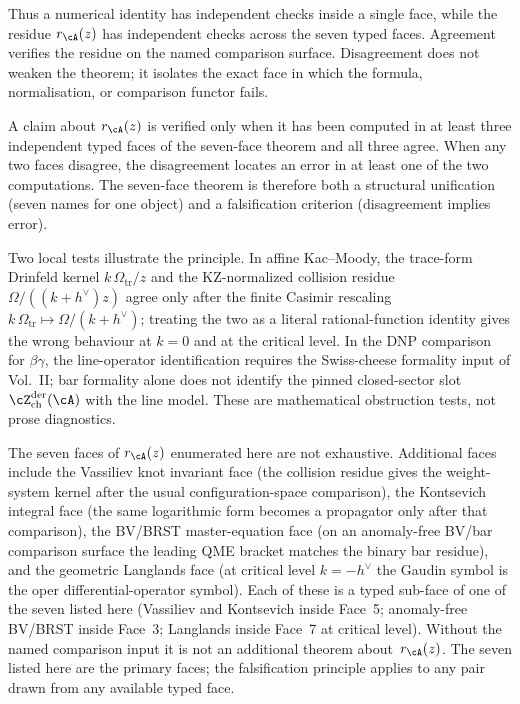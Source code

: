 Thus a numerical identity has independent checks inside a single
face, while the residue $r_\cA(z)$ has independent checks across the
seven typed faces. Agreement verifies the residue on the named
comparison surface. Disagreement does not weaken the theorem; it
isolates the exact face in which the formula, normalisation, or
comparison functor fails.

\begin{principle}
\label{princ:hdm-falsification}
A claim about $r_\cA(z)$ is verified only when it has been computed
in at least three independent typed faces of the seven-face theorem and
all three agree. When any two faces disagree, the disagreement
locates an error in at least one of the two computations. The
seven-face theorem is therefore both a structural unification
\textup{(}seven names for one object\textup{)} and a falsification
criterion \textup{(}disagreement implies error\textup{)}.
\end{principle}

Two local tests illustrate the principle. In affine Kac--Moody, the
trace-form Drinfeld kernel $k\,\Omega_{\mathrm{tr}}/z$ and the
KZ-normalized collision residue $\Omega/((k+h^\vee)z)$ agree only
after the finite Casimir rescaling
$k\,\Omega_{\mathrm{tr}}\mapsto\Omega/(k+h^\vee)$; treating the two as
a literal rational-function identity gives the wrong behaviour at
$k=0$ and at the critical level. In the DNP comparison for
$\beta\gamma$, the line-operator identification requires the
Swiss-cheese formality input of Vol.~II; bar formality alone does not
identify the pinned closed-sector slot
$\cZ^{\mathrm{der}}_{\mathrm{ch}}(\cA)$ with the line model. These are
mathematical obstruction tests, not prose diagnostics.

\begin{remark}
\label{rem:hdm-why-seven}
The seven faces of $r_\cA(z)$ enumerated here are not exhaustive.
Additional faces include the Vassiliev knot invariant face (the
collision residue gives the weight-system kernel after the usual
configuration-space comparison), the Kontsevich integral face (the
same logarithmic form becomes a propagator only after that comparison),
the BV/BRST master-equation face (on an anomaly-free BV/bar comparison
surface the leading QME bracket matches the binary bar residue), and
the geometric Langlands face (at critical level $k=-h^\vee$ the
Gaudin symbol is the oper differential-operator symbol). Each of
these is a typed sub-face of one of the seven listed here
\textup{(}Vassiliev and Kontsevich inside Face~5; anomaly-free BV/BRST
inside Face~3; Langlands inside Face~7 at critical level\textup{)}.
Without the named comparison input it is not an additional theorem
about~$r_\cA(z)$. The seven listed here are the primary faces; the
falsification principle applies to any pair drawn from any available
typed face.
\end{remark}


